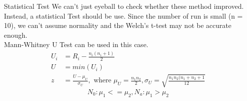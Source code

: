     \begin{frame}{Statistical Test}
        We can't just eyeball to check whether these method improved. Instead, a statistical Test should be use.
        Since the number of run is small (n = 10), we can't assume normality and the Welch's t-test\cite{10.1093/biomet/34.1-2.28} may not be accurate enough.\\
        Mann-Whitney U Test\cite{Mann-Whitney} can be used in this case.
        \begin{align*}
            U_i &= R_i - \frac{n_i(n_i + 1)}{2} \\
            U &= min(U_i) \\
            z &= \frac{U - \mu_U}{\sigma_U},\text{ where } \mu_U = \frac{n_1n_2}{2}, \sigma_U = \sqrt{\frac{n_1n_2(n_1 + n_2 + 1}{12}}
        \end{align*}
        \begin{equation*}
            N_0 : \mu_1 <= \mu_2, N_a : \mu_1 > \mu_2
        \end{equation*}
    \end{frame}


